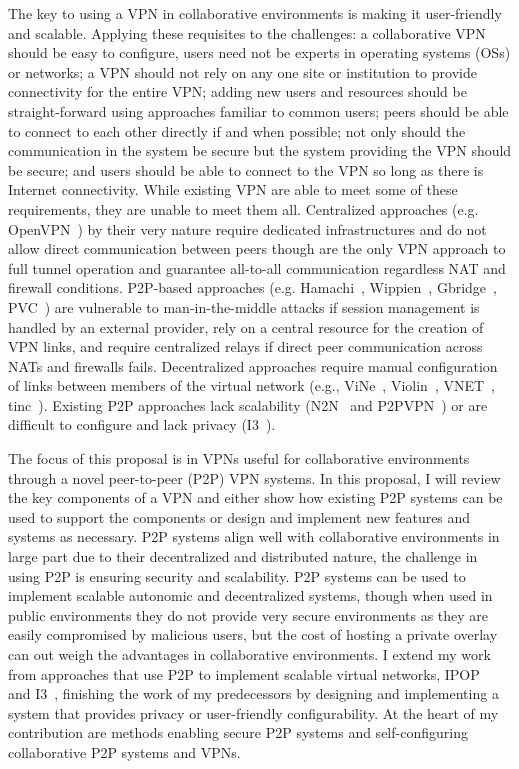 The key to using a VPN in collaborative environments is making it user-friendly
and scalable.  Applying these requisites to the challenges:  a collaborative
VPN should be easy to configure, users need not be experts in operating systems
(OSs) or networks; a VPN should not rely on any one site or institution to
provide connectivity for the entire VPN; adding new users and resources should
be straight-forward using approaches familiar to common users; peers should be
able to connect to each other directly if and when possible; not only should
the communication in the system be secure but the system providing the VPN
should be secure; and users should be able to connect to the VPN so long as
there is Internet connectivity.  While existing VPN are able to meet some of
these requirements, they are unable to meet them all.  Centralized approaches
(e.g.  OpenVPN~\cite{openvpn}) by their very nature require dedicated
infrastructures and do not allow direct communication between peers though are
the only VPN approach to full tunnel operation and guarantee all-to-all
communication regardless NAT and firewall conditions.  P2P-based approaches
(e.g. Hamachi~\cite{hamachi}, Wippien~\cite{wippien}, Gbridge~\cite{gbridge},
PVC~\cite{pvc}) are vulnerable to man-in-the-middle attacks if session
management is handled by an external provider, rely on a central resource for
the creation of VPN links, and require centralized relays if direct peer
communication across NATs and firewalls fails.  Decentralized approaches
require manual configuration of links between members of the virtual network
(e.g., ViNe~\cite{vine}, Violin~\cite{violin}, VNET~\cite{vnet},
tinc~\cite{tinc}).  Existing P2P approaches lack scalability (N2N~\cite{n2n}
and P2PVPN~\cite{p2pvpn}) or are difficult to configure and lack privacy
(I3~\cite{i3}).

The focus of this proposal is in VPNs useful for collaborative environments
through a novel peer-to-peer (P2P) VPN systems.  In this proposal, I will
review the key components of a VPN and either show how existing P2P systems can
be used to support the components or design and implement new features and
systems as necessary.  P2P systems align well with collaborative environments
in large part due to their decentralized and distributed nature, the challenge
in using P2P is ensuring security and scalability.  P2P systems can be used
to implement scalable autonomic and decentralized systems, though when used
in public environments they do not provide very secure environments as they
are easily compromised by malicious users, but the cost of hosting a private
overlay can out weigh the advantages in collaborative environments.  I extend
my work from approaches that use P2P to implement scalable virtual networks,
IPOP~\cite{ipop} and I3~\cite{i3}, finishing the work of my predecessors by
designing and implementing a system that provides privacy or user-friendly
configurability.  At the heart of my contribution are methods enabling secure
P2P systems and self-configuring collaborative P2P systems and VPNs.

